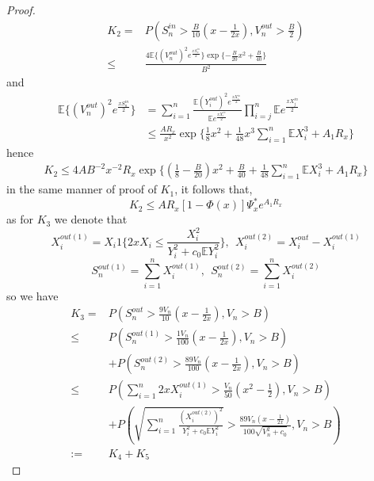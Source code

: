 \documentclass[bj,authoryear]{imsart}
\numberwithin{equation}{section}
\theoremstyle{plain}
\theoremstyle{definition}
\begin{document}
\begin{proof}
\begin{equation}
    \begin{aligned}
      K_2 =& P(S_n^{in}>\frac{B}{10}(x-\frac{1}{2x}),V_n^{out}>\frac{B}{2})\\
      \leq &\frac{4\mathbb{E} \{(V_{n}^{out})^2e^{\frac{xS_{n}^{in}}{2}}\}\exp\{-\frac{B}{20}x^2+\frac{B}{40}\}}{B^2}
    \end{aligned}
  \end{equation}
  and
  \begin{equation}
    \begin{aligned}
      \mathbb{E} \{(V_{n}^{out})^2e^{\frac{xS_{n}^{in}}{2}}\} & = \sum_{i=1}^{n}\frac{\mathbb{E} (Y_i^{out})^2e^{\frac{xX_{i}^{in}}{2}}}{\mathbb{E} e^{\frac{xX_{i}^{in}}{2}}}\prod_{i=j}^{n}\mathbb{E} e^{\frac{xX_{j}^{in}}{2}}\\
      &\leq \frac{AR_x}{x^2}\exp\{\frac{1}{8}x^2+\frac{1}{48}x^3\sum_{i=1}^{n}\mathbb{E} X_i^3+A_1R_x\}
    \end{aligned}
  \end{equation}
  hence
  \begin{equation}
    \begin{aligned}
      K_2\leq 4AB^{-2}x^{-2}R_x\exp\{(\frac{1}{8}-\frac{B}{20})x^2+\frac{B}{40}+\frac{1}{48}\sum_{i=1}^{n}\mathbb{E} X_i^3+A_1R_x\}
    \end{aligned}
  \end{equation}
  in the same manner of proof of $K_1$, it follows that,
  $$K_2 \leq AR_x[1-\Phi(x)]\Psi_{x}^{*}e^{A_1R_x}$$
  as for $K_3$ we denote that
  $$X_{i}^{out(1)} = X_i1\{2xX_i\leq \frac{X_i^2}{Y_i^2+c_0\mathbb{E} Y_i^2}\},\ \ X_{i}^{out(2)} = X_{i}^{out}-X_{i}^{out(1)}$$
  $$S_{n}^{out(1)} = \sum_{i=1}^{n}X_{i}^{out(1)}, \ \ S_{n}^{out(2)} = \sum_{i=1}^{n}X_{i}^{out(2)}$$
  so we have 
  \begin{equation}
    \begin{aligned}
      K_3 =& P(S_n^{out}>\frac{9V_n}{10}(x-\frac{1}{2x}),V_n>B)\\
      \leq & P(S_n^{out(1)}>\frac{1V_n}{100}(x-\frac{1}{2x}),V_n>B)\\
      & + P(S_n^{out(2)}>\frac{89V_n}{100}(x-\frac{1}{2x}),V_n>B)\\
      \leq & P(\sum_{i=1}^{n}2xX_{i}^{out(1)}>\frac{V_n}{50}(x^2-\frac{1}{2}),V_n>B)\\
      &+P(\sqrt{\sum_{i=1}^{n}\frac{(X_{i}^{out(2)})^{2}}{Y_i^2+c_0\mathbb{E} Y_i^2}}>\frac{89V_n(x-\frac{1}{2x})}{100\sqrt{V_n^2+c_0}},V_n>B)\\
      :=&K_4+K_5
    \end{aligned}

\end{equation}
\end{proof}
\end{document}
